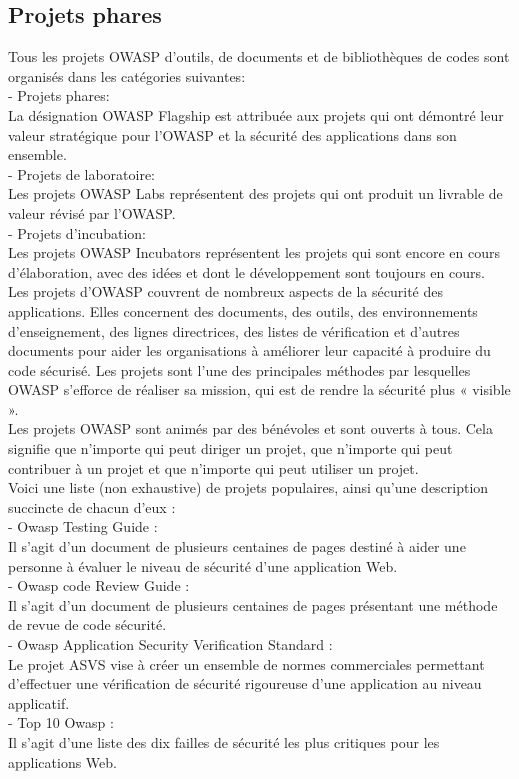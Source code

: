 \subsection{Projets phares}
Tous les projets OWASP d'outils, de documents et de bibliothèques de codes sont organisés dans les catégories suivantes: \\
- Projets phares: \\
La désignation OWASP Flagship est attribuée aux projets qui ont démontré leur valeur stratégique pour l’OWASP et la sécurité des applications dans son ensemble.\\
- Projets de laboratoire: \\
Les projets OWASP Labs représentent des projets qui ont produit un livrable de valeur révisé par l’OWASP.\\
- Projets d'incubation: \\
Les projets OWASP Incubators représentent les projets qui sont encore en cours d'élaboration, avec des idées et dont le développement sont toujours en cours.\\
Les projets d'OWASP couvrent de nombreux aspects de la sécurité des applications. Elles concernent des documents, des outils, des environnements d'enseignement, des lignes directrices, des listes de vérification et d'autres documents pour aider les organisations à améliorer leur capacité à produire du code sécurisé. Les projets sont l'une des principales méthodes par lesquelles OWASP s'efforce de réaliser sa mission, qui est de rendre la sécurité plus « visible ».\\
Les projets OWASP sont animés par des bénévoles et sont ouverts à tous. Cela signifie que n'importe qui peut diriger un projet, que n'importe qui peut contribuer à un projet et que n'importe qui peut utiliser un projet. \\
Voici une liste (non exhaustive) de projets populaires, ainsi qu’une description succincte de chacun d'eux :\\
- Owasp Testing Guide : \\
Il s'agit d'un document de plusieurs centaines de pages destiné à aider une personne à évaluer le niveau de sécurité d'une application Web. \\
- Owasp code Review Guide : \\
Il s'agit d'un document de plusieurs centaines de pages présentant une méthode de revue de code sécurité.\\
- Owasp Application Security Verification Standard : \\
Le projet ASVS vise à créer un ensemble de normes commerciales permettant d'effectuer une vérification de sécurité rigoureuse d’une application au niveau applicatif.\\
- Top 10 Owasp : \\
Il s'agit d'une liste des dix failles de sécurité les plus critiques pour les applications Web.\\

